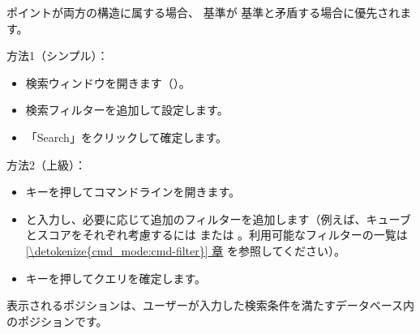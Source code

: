 \documentclass[letterpaper,10pt,dvipdfmx]{sphinxmanual}
\begin{document}
\sphinxAtStartPar
ポイントが両方の構造に属する場合、 基準が  基準と矛盾する場合に優先されます。

\sphinxAtStartPar
方法1（シンプル）：
\begin{itemize}
\item {} 
\sphinxAtStartPar
検索ウィンドウを開きます（）。

\item {} 
\sphinxAtStartPar
検索フィルターを追加して設定します。

\item {} 
\sphinxAtStartPar
「Search」をクリックして確定します。

\end{itemize}

\sphinxAtStartPar
方法2（上級）：
\begin{itemize}
\item {} 
\sphinxAtStartPar
{} キーを押してコマンドラインを開きます。

\item {} 
\sphinxAtStartPar
{} と入力し、必要に応じて追加のフィルターを追加します（例えば、キューブとスコアをそれぞれ考慮するには  または 。利用可能なフィルターの一覧は \hyperref[\detokenize{cmd_mode:cmd-filter}]{\ref{\detokenize{cmd_mode:cmd-filter}} 章} を参照してください）。

\item {} 
\sphinxAtStartPar
{} キーを押してクエリを確定します。

\end{itemize}

\sphinxAtStartPar
表示されるポジションは、ユーザーが入力した検索条件を満たすデータベース内のポジションです。
\end{document}
